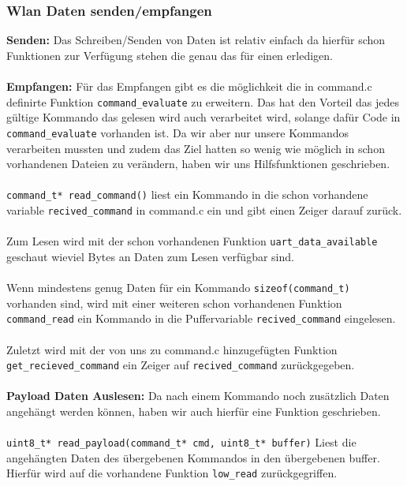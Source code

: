 \subsubsection{Wlan Daten senden/empfangen}
\label{wlan_funktionen}


\textbf{Senden:} Das Schreiben/Senden von Daten ist relativ einfach da hierfür schon Funktionen zur Verfügung stehen die genau das für einen erledigen.\\
\\
\textbf{Empfangen:} Für das Empfangen gibt es die möglichkeit die in command.c definirte Funktion \verb|command_evaluate| zu erweitern. Das hat den Vorteil das jedes gültige Kommando das gelesen wird auch verarbeitet wird, solange dafür Code in \verb|command_evaluate| vorhanden ist.
Da wir aber nur unsere Kommandos verarbeiten mussten und zudem das Ziel hatten so wenig wie möglich in schon vorhandenen Dateien zu verändern, haben wir uns Hilfsfunktionen geschrieben.\\
\\
\verb|command_t* read_command()| liest ein Kommando in die schon vorhandene variable \verb|recived_command| in command.c ein und gibt einen Zeiger darauf zurück.\\
\\
Zum Lesen wird mit der schon vorhandenen Funktion \verb|uart_data_available| geschaut wieviel Bytes an Daten zum Lesen verfügbar sind.\\
\\
Wenn mindestens genug Daten für ein Kommando \verb|sizeof(command_t)| vorhanden sind, wird mit einer weiteren schon vorhandenen Funktion \verb|command_read| ein Kommando in die Puffervariable \verb|recived_command| eingelesen.\\
\\
Zuletzt wird mit der von uns zu command.c hinzugefügten Funktion \verb|get_recieved_command| ein Zeiger auf \verb|recived_command| zurückgegeben.\\
\\
\textbf{Payload Daten Auslesen:} Da nach einem Kommando noch zusätzlich Daten angehängt werden können, haben wir auch hierfür eine Funktion geschrieben.\\
\\
\verb|uint8_t* read_payload(command_t* cmd, uint8_t* buffer)| Liest die angehängten Daten des übergebenen Kommandos in den übergebenen buffer.\\ Hierfür wird auf die vorhandene Funktion \verb|low_read| zurückgegriffen.
\\


